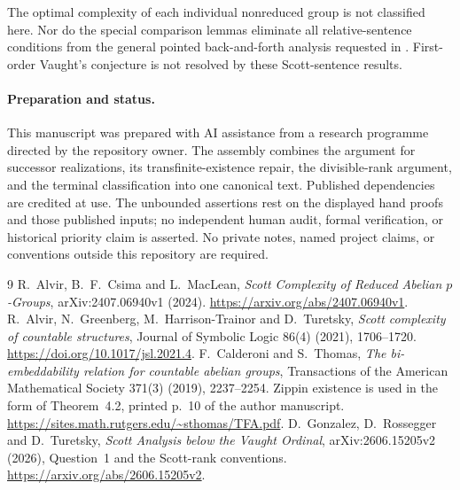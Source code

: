 \documentclass[11pt]{article}
\begin{document}
The optimal complexity of each individual nonreduced group is not
classified here. Nor do the special comparison lemmas eliminate all
relative-sentence conditions from the general pointed back-and-forth
analysis requested in \cite[Question~5.3]{ACM}. First-order Vaught's
conjecture is not resolved by these Scott-sentence results.

\paragraph{Preparation and status.}
This manuscript was prepared with AI assistance from a research programme
directed by the repository owner. The assembly combines the argument
for successor realizations, its transfinite-existence repair, the
divisible-rank argument, and the terminal classification into one
canonical text. Published dependencies are credited at use. The
unbounded assertions rest on the displayed hand proofs and those
published inputs; no independent human audit, formal verification, or
historical priority claim is asserted. No private notes, named project
claims, or conventions outside this repository are required.

\begin{thebibliography}{9}
 R.~Alvir, B.~F.~Csima and L.~MacLean,
\emph{Scott Complexity of Reduced Abelian $p$-Groups},
arXiv:2407.06940v1 (2024).
\url{https://arxiv.org/abs/2407.06940v1}.
 R.~Alvir, N.~Greenberg, M.~Harrison-Trainor and
D.~Turetsky, \emph{Scott complexity of countable structures},
Journal of Symbolic Logic 86(4) (2021), 1706--1720.
\url{https://doi.org/10.1017/jsl.2021.4}.
 F.~Calderoni and S.~Thomas,
\emph{The bi-embeddability relation for countable abelian groups},
Transactions of the American Mathematical Society 371(3) (2019),
2237--2254. Zippin existence is used in the form of Theorem~4.2,
printed p.~10 of the author manuscript.
\url{https://sites.math.rutgers.edu/~sthomas/TFA.pdf}.
 D.~Gonzalez, D.~Rossegger and D.~Turetsky,
\emph{Scott Analysis below the Vaught Ordinal},
arXiv:2606.15205v2 (2026), Question~1 and the Scott-rank conventions.
\url{https://arxiv.org/abs/2606.15205v2}.
\end{thebibliography}
\end{document}
